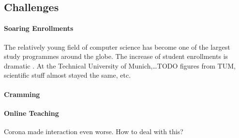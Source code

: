 \subsection{Challenges}

\paragraph{Soaring Enrollments}
The relatively young field of computer science has
become one of the largest study programmes around the globe.
The increase of student enrollments is dramatic \citep{comp_sci_growth1,comp_sci_growth2}.
At the Technical University of Munich,\dots TODO figures from TUM, scientific stuff almost stayed the same, etc.

\paragraph{Cramming}

\paragraph{Online Teaching}
Corona made interaction even worse.
How to deal with this?



